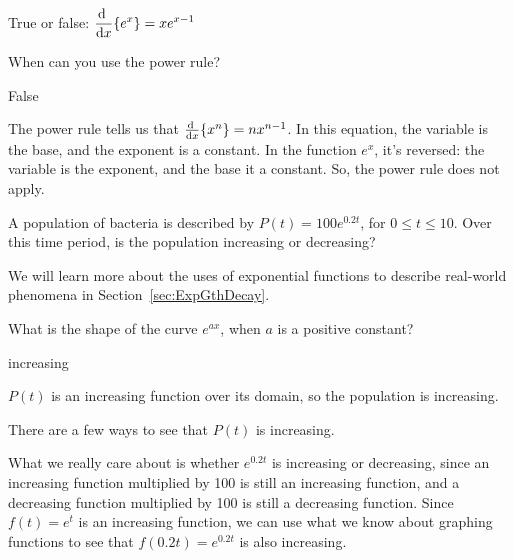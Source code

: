 \begin{question}
True or false: $\ds\diff{}{x}\{e^x\}=xe^{x-1}$
\end{question}
\begin{hint}
When can you use the power rule?
\end{hint}
\begin{answer}
False
\end{answer}
\begin{solution}
The power rule tells us that $\diff{}{x}\{x^n\}=nx^{n-1}$. In this equation, the variable is the base, and the exponent is a constant. In the function $e^x$, it's reversed: the variable is the exponent, and the base it a constant. So, the power rule does not apply.
\end{solution}



\begin{question}
A population of bacteria is described by $P(t)=100e^{0.2t}$, for $0 \leq t \leq 10$. Over this time period, is the population increasing or decreasing?

\medskip
We will learn more about the uses of exponential functions to describe real-world phenomena in Section~\ref*{sec:ExpGthDecay}.
\end{question}
\begin{hint} What is the shape of the curve $e^{ax}$, when $a$ is a positive constant?
\end{hint}
\begin{answer} increasing
\end{answer}
\begin{solution}
$P(t)$ is an increasing function over its domain, so the population is increasing.

There are a few ways to see that $P(t)$ is increasing.

 What we really care about is whether $e^{0.2t}$ is increasing or decreasing, since an increasing function multiplied by 100 is still an increasing function, and a decreasing function multiplied by 100 is still a decreasing function. Since $f(t)=e^t$ is an increasing function, we can use what we know about graphing functions to see that $f(0.2t)=e^{0.2t}$ is also increasing.
\end{solution}


\subsection*{\Procedural}

